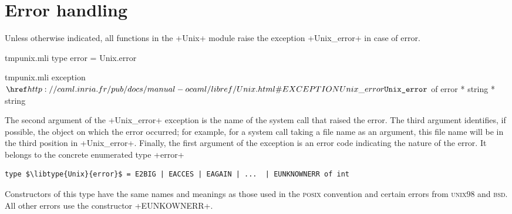 \section{Error handling}

Unless otherwise indicated, all functions in the \ml+Unix+ module
raise the exception \ml+Unix_error+ in case of error.
%
\begin{codefile}{tmpunix.mli}
type error = Unix.error
\end{codefile}
%
\begin{listingcodefile}{tmpunix.mli}
exception $\libexn{Unix}{Unix\_error}$ of error * string * string
\end{listingcodefile}
%
The second argument of the \ml+Unix_error+ exception is the name of
the system call that raised the error. The third argument identifies,
if possible, the object on which the error occurred; for example, for
a system call taking a file name as an argument, this file name will be
in the third position in \ml+Unix_error+. Finally, the first argument
of the exception is an error code indicating the nature of the
error. It belongs to the concrete enumerated type \ml+error+
%
\begin{lstlisting}
type $\libtype{Unix}{error}$ = E2BIG | EACCES | EAGAIN | ...  | EUNKNOWNERR of int
\end{lstlisting}
%
Constructors of this type have the same names and meanings as those
used in the \textsc{posix} convention and  certain errors from
\textsc{unix98} and \textsc{bsd}. All other errors use the constructor \ml+EUNKOWNERR+.


